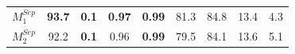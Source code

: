 \begin{table}[t]
{\begin{adjustbox}{width=1.2\textwidth,center}
\begin{tabular}{|c|cc|cc|cccc|}
                $M^{Sep}_1$                           & \textbf{93.7}                           & \textbf{0.1}                  & \textbf{0.97}                       & \textbf{0.99}                    & 81.3                   & 84.8                   & 13.4                  & 4.3                     \\
                $M^{Sep}_2$                           & 92.2                                    & \textbf{0.1}                  & 0.96                                & \textbf{0.99}                    & 79.5                   & 84.1                   & 13.6                  & 5.1                     \\ \hline
            \end{tabular}
        \end{adjustbox}
    }


\end{table}
